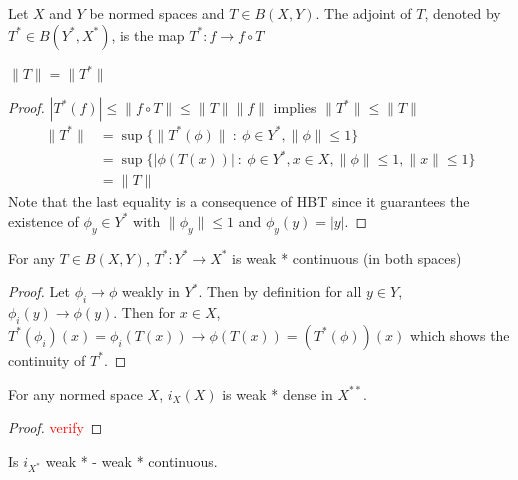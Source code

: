 
\chapter{}

\begin{definition}
  Let $X$ and $Y$ be normed spaces and $T \in B(X, Y)$. The adjoint
  of $T$, denoted by $T^{*} \in B(Y^{*}, X^{*})$, is the map $T^{*}:
  f \to f\circ T$
\end{definition}

\begin{proposition}
  $\|T\| = \|T^*\|$
\end{proposition}
\begin{proof}
  $|T^*(f)| \le \|f \circ T\| \le \|T\|\|f\|$ implies $ \|T^{*}\| \le \|T\|$
  \begin{align*}
    \|T^*\| & = \sup \{ \|T^{*}(\phi)\| \ : \ \phi \in Y^*, \|\phi\| \le 1 \} \\
    &= \sup \{ |\phi(T(x))| \ : \ \phi \in Y^*, x \in X, \|\phi\| \le
    1, \|x\| \le 1 \} \\
    &= \|T\|
  \end{align*}
  Note that the last equality is a consequence of HBT since it
  guarantees the existence of $\phi_y \in Y^*$ with $\|\phi_y\|\le 1$
  and $\phi_y(y) = |y|$.
\end{proof}

\begin{lemma}
  For any $T \in B(X, Y)$, $T^*: Y^* \to X^*$ is weak * continuous
  (in both spaces)
\end{lemma}
\begin{proof}
  Let $\phi_i \to \phi$ weakly in $Y^*$. Then by definition for all
  $y \in Y$, $\phi_i(y) \to \phi(y)$. Then for $x \in X$,
  $T^*(\phi_i)(x) = \phi_i(T(x)) \to \phi(T(x)) = (T^*(\phi))(x)$
  which shows the continuity of $T^*$.
\end{proof}

\begin{lemma}
  For any normed space $X$, $i_X(X)$ is weak * dense in $X^{**}$.
\end{lemma}
\begin{proof}
  \textcolor{red}{verify}
\end{proof}

\begin{example}
  Is $i_{X^*}$ weak * - weak * continuous.
\end{example}

